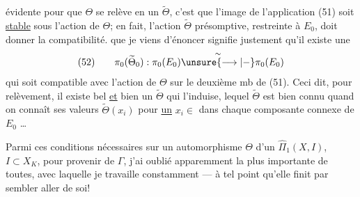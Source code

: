 évidente pour que $\Theta$ se relève en un $\widetilde{\Theta}$, c'est que l'image de l'application (51) soit \uline{stable} sous l'action de $\Theta$; en fait, l'action $\widetilde{\Theta}$ présomptive, restreinte à $E_0$, doit donner la compatibilité.     que je viens d'énoncer signifie justement qu'il existe une  
\[
(52)\qquad \pi_0(\widetilde{\Theta}_0):\pi_0(E_0)\overset{\sim}{\unsure{\longrightarrow|\mathbin{-}}}\pi_0(E_0)
\]
 qui soit compatible avec l'action de $\Theta$ sur le deuxième mb de (51). Ceci dit, pour  relèvement, il existe bel  \uline{et} bien un $\widetilde{\Theta}$ qui l'induise,  lequel $\widetilde{\Theta}$ est bien connu quand on connaît ses valeurs $\widetilde{\Theta}(x_i)$  pour \uline{un} $x_i\in$   dans chaque composante connexe de $E_0$ \ldots

Parmi ces conditions nécessaires  sur un automorphisme $\Theta$ d'un $\widehat{\Pi}_1(X,I)$, $I\subset X_K$, pour provenir de $\Gamma$, j'ai oublié apparemment la plus importante de toutes, avec laquelle je travaille  constamment --- à tel point qu'elle finit par sembler aller de soi!
